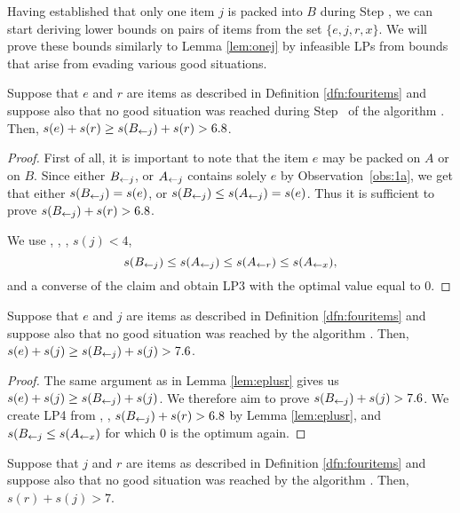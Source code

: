 Having established that only one item $j$ is packed into $B$ during
Step , we can start deriving lower bounds on pairs of
items from the set $\{e,j,r,x\}$. We will prove these bounds similarly
to Lemma \ref{lem:onej} by infeasible LPs from bounds that arise from
evading various good situations.

\begin{lem}\label{lem:eplusr}
Suppose that $e$ and $r$ are items as described in Definition \ref{dfn:fouritems} and suppose
also that no good situation was reached during Step~{\rm {}} of the algorithm \tbalg.
Then, $s(e) + s(r) \ge  s(B_{\leftarrow j}) + s(r) > 6.8$.
\end{lem}

\begin{proof}
First of all, it is important to note that the item $e$ may be
packed on $A$ or on $B$.
Since either $B_{\leftarrow j}$, or $A_{\leftarrow j}$ contains solely $e$
by Observation~\ref{obs:1a}, we get that either $s(B_{\leftarrow j}) = s(e)$,
or $s(B_{\leftarrow j}) \le s(A_{\leftarrow j}) = s(e)$. Thus it is sufficient to prove
$s(B_{\leftarrow j}) + s(r) > 6.8$.

We use , , , $s(j) < 4$, \[s(B_{\leftarrow j}) \le s(A_{\leftarrow j}) \le s(A_{\leftarrow r}) \le s(A_{\leftarrow x}),\]
and a converse of the claim and obtain LP3 with the optimal value equal to 0.
\end{proof}

\begin{lem}\label{lem:eplusj}
Suppose that $e$ and $j$ are items as described in Definition \ref{dfn:fouritems} and suppose
also that no good situation was reached by the algorithm \tbalg.
Then, $s(e) + s(j) \ge  s(B_{\leftarrow j}) + s(j) > 7.6$.
\end{lem}

\begin{proof}
The same argument as in Lemma \ref{lem:eplusr} gives us $s(e) + s(j) \ge  s(B_{\leftarrow j}) + s(j)$.
We therefore aim to prove $s(B_{\leftarrow j}) + s(j) > 7.6$. 
We create LP4 from , , $s(B_{\leftarrow j}) + s(r) > 6.8$ by Lemma \ref{lem:eplusr},
and $s(B_{\leftarrow j} \leq s(A_{\leftarrow x})$ for which 0 is the optimum again.

\end{proof}

\begin{lem}\label{lem:rplusj}
Suppose that $j$ and $r$ are items as described in Definition \ref{dfn:fouritems} and suppose
also that no good situation was reached by the algorithm \tbalg. Then, $s(r) + s(j) > 7$.
\end{lem}

